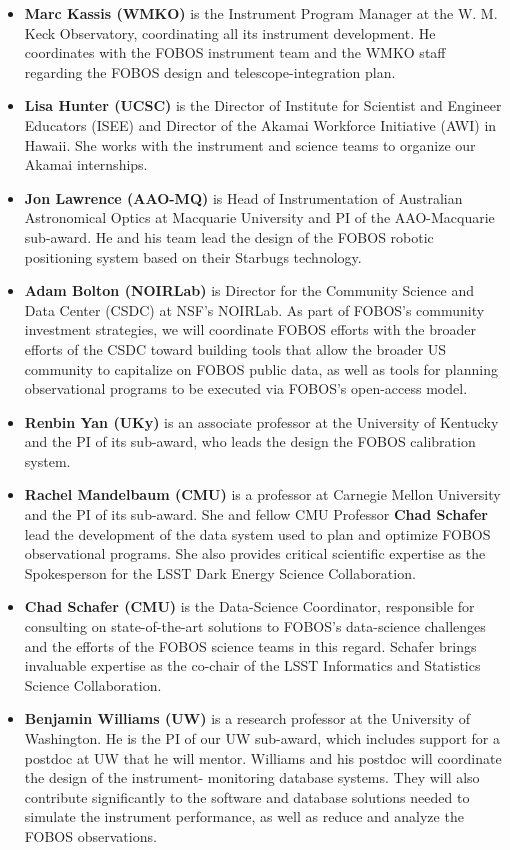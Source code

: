 \documentclass[oneside,11pt]{amsart}
\begin{document}
\begin{itemize}
%
\item {\bf Marc Kassis (WMKO)} is the Instrument Program Manager at the W. M. Keck Observatory, coordinating all its instrument development. He coordinates with the FOBOS instrument team and the WMKO staff regarding the FOBOS design and telescope-integration plan.\\[-5pt]
%
\item {\bf Lisa Hunter (UCSC)} is the Director of Institute for Scientist and Engineer Educators (ISEE) and Director of the Akamai Workforce Initiative (AWI) in Hawaii. She works with the instrument and science teams to organize our Akamai internships.\\[-5pt]
%
\item {\bf Jon Lawrence (AAO-MQ)} is Head of Instrumentation of Australian Astronomical Optics at Macquarie University and PI of the AAO-Macquarie sub-award. He and his team lead the design of the FOBOS robotic positioning system based on their Starbugs technology.\\[-5pt]
%
\item {\bf Adam Bolton (NOIRLab)} is Director for the Community Science and Data Center (CSDC) at NSF’s NOIRLab. As part of FOBOS’s community investment strategies, we will coordinate FOBOS efforts with the broader efforts of the CSDC toward building tools that allow the broader US community to capitalize on FOBOS public data, as well as tools for planning observational programs to be executed via FOBOS’s open-access model.\\[-5pt]
%
\item {\bf Renbin Yan (UKy)} is an associate professor at the University of Kentucky and the PI of its sub-award, who leads the design the FOBOS calibration system.\\[-5pt]
%
\item {\bf Rachel Mandelbaum (CMU)} is a professor at Carnegie Mellon University and the PI of its sub-award. She and fellow CMU Professor {\bf Chad Schafer} lead the development of the data system used to plan and optimize FOBOS observational programs. She also provides critical scientific expertise as the Spokesperson for the LSST Dark Energy Science Collaboration.\\[-5pt]
%
\item {\bf Chad Schafer (CMU)}  is the Data-Science Coordinator, responsible for consulting on state-of-the-art solutions to FOBOS’s data-science challenges and the efforts of the FOBOS science teams in this regard. Schafer brings invaluable expertise as the co-chair of the LSST Informatics and Statistics Science Collaboration.\\[-5pt]
%
\item {\bf Benjamin Williams (UW)} is a research professor at the University of Washington. He is the PI of our UW sub-award, which includes support for a postdoc at UW that he will mentor. Williams and his postdoc will coordinate the design of the instrument- monitoring database systems. They will also contribute significantly to the software and database solutions needed to simulate the instrument performance, as well as reduce and analyze the FOBOS observations.
%
\end{itemize}
\end{document}
